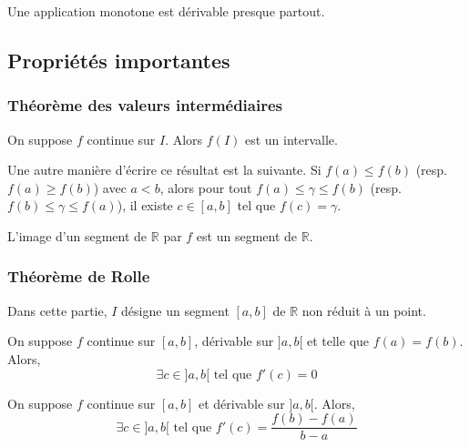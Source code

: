 	\begin{theorem}[Lebesgue]
		Une application monotone est dérivable presque partout.
	\end{theorem}
	
	\subsection{Propriétés importantes}
	
	\subsubsection{Théorème des valeurs intermédiaires}
	
	
	\begin{theorem}
		On suppose $f$ continue sur $I$. Alors $f(I)$ est un intervalle.
	\end{theorem}
	
	\begin{remark}
		Une autre manière d'écrire ce résultat est la suivante. Si $f(a) \leq f(b)$ (resp. $f(a) \geq f(b)$) avec $a < b$, alors pour tout $f(a) \leq \gamma \leq f(b)$ (resp. $f(b) \leq \gamma \leq f(a)$), il existe $c \in [a,b]$ tel que $f(c) = \gamma$.
	\end{remark}
	
	\begin{corollary}
		L'image d'un segment de $\mathbb{R}$ par $f$ est un segment de $\mathbb{R}$.
	\end{corollary}
	
	\subsubsection{Théorème de Rolle}
	
	Dans cette partie, $I$ désigne un segment $[a,b]$ de $\mathbb{R}$ non réduit à un point.
	
	\begin{theorem}[Rolle]
		On suppose $f$ continue sur $[a,b]$, dérivable sur $]a,b[$ et telle que $f(a) = f(b)$. Alors,
		\[ \exists c \in ]a,b[ \text{ tel que } f'(c) = 0 \]
	\end{theorem}
	
	\begin{theorem}
		On suppose $f$ continue sur $[a,b]$ et dérivable sur $]a,b[$. Alors,
		\[ \exists c \in ]a,b[ \text{ tel que } f'(c) = \frac{f(b) - f(a)}{b-a} \]
	\end{theorem}
	

